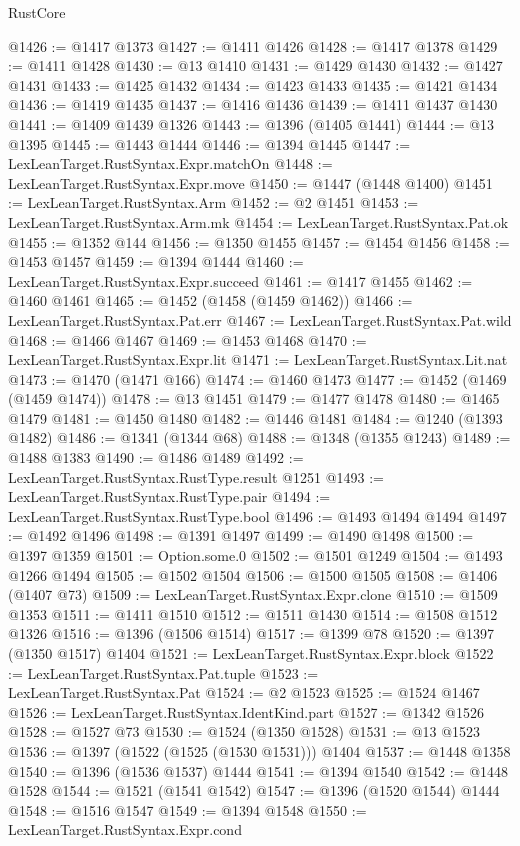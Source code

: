 \begin{lexlean}{RustCore}
\begin{coremodule}
@1426 := @1417 @1373
@1427 := @1411 @1426
@1428 := @1417 @1378
@1429 := @1411 @1428
@1430 := @13 @1410
@1431 := @1429 @1430
@1432 := @1427 @1431
@1433 := @1425 @1432
@1434 := @1423 @1433
@1435 := @1421 @1434
@1436 := @1419 @1435
@1437 := @1416 @1436
@1439 := @1411 @1437 @1430
@1441 := @1409 @1439 @1326
@1443 := @1396 (@1405 @1441)
@1444 := @13 @1395
@1445 := @1443 @1444
@1446 := @1394 @1445
@1447 := LexLeanTarget.RustSyntax.Expr.matchOn
@1448 := LexLeanTarget.RustSyntax.Expr.move
@1450 := @1447 (@1448 @1400)
@1451 := LexLeanTarget.RustSyntax.Arm
@1452 := @2 @1451
@1453 := LexLeanTarget.RustSyntax.Arm.mk
@1454 := LexLeanTarget.RustSyntax.Pat.ok
@1455 := @1352 @144
@1456 := @1350 @1455
@1457 := @1454 @1456
@1458 := @1453 @1457
@1459 := @1394 @1444
@1460 := LexLeanTarget.RustSyntax.Expr.succeed
@1461 := @1417 @1455
@1462 := @1460 @1461
@1465 := @1452 (@1458 (@1459 @1462))
@1466 := LexLeanTarget.RustSyntax.Pat.err
@1467 := LexLeanTarget.RustSyntax.Pat.wild
@1468 := @1466 @1467
@1469 := @1453 @1468
@1470 := LexLeanTarget.RustSyntax.Expr.lit
@1471 := LexLeanTarget.RustSyntax.Lit.nat
@1473 := @1470 (@1471 @166)
@1474 := @1460 @1473
@1477 := @1452 (@1469 (@1459 @1474))
@1478 := @13 @1451
@1479 := @1477 @1478
@1480 := @1465 @1479
@1481 := @1450 @1480
@1482 := @1446 @1481
@1484 := @1240 (@1393 @1482)
@1486 := @1341 (@1344 @68)
@1488 := @1348 (@1355 @1243)
@1489 := @1488 @1383
@1490 := @1486 @1489
@1492 := LexLeanTarget.RustSyntax.RustType.result @1251
@1493 := LexLeanTarget.RustSyntax.RustType.pair
@1494 := LexLeanTarget.RustSyntax.RustType.bool
@1496 := @1493 @1494 @1494
@1497 := @1492 @1496
@1498 := @1391 @1497
@1499 := @1490 @1498
@1500 := @1397 @1359
@1501 := Option.some.{0}
@1502 := @1501 @1249
@1504 := @1493 @1266 @1494
@1505 := @1502 @1504
@1506 := @1500 @1505
@1508 := @1406 (@1407 @73)
@1509 := LexLeanTarget.RustSyntax.Expr.clone
@1510 := @1509 @1353
@1511 := @1411 @1510
@1512 := @1511 @1430
@1514 := @1508 @1512 @1326
@1516 := @1396 (@1506 @1514)
@1517 := @1399 @78
@1520 := @1397 (@1350 @1517) @1404
@1521 := LexLeanTarget.RustSyntax.Expr.block
@1522 := LexLeanTarget.RustSyntax.Pat.tuple
@1523 := LexLeanTarget.RustSyntax.Pat
@1524 := @2 @1523
@1525 := @1524 @1467
@1526 := LexLeanTarget.RustSyntax.IdentKind.part
@1527 := @1342 @1526
@1528 := @1527 @73
@1530 := @1524 (@1350 @1528)
@1531 := @13 @1523
@1536 := @1397 (@1522 (@1525 (@1530 @1531))) @1404
@1537 := @1448 @1358
@1540 := @1396 (@1536 @1537) @1444
@1541 := @1394 @1540
@1542 := @1448 @1528
@1544 := @1521 (@1541 @1542)
@1547 := @1396 (@1520 @1544) @1444
@1548 := @1516 @1547
@1549 := @1394 @1548
@1550 := LexLeanTarget.RustSyntax.Expr.cond

\end{coremodule}
\end{lexlean}
